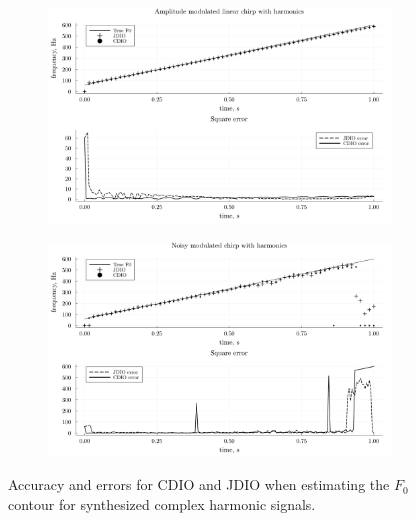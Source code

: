 \documentclass[a4paper]{article}
\begin{document}
\begin{figure}
    \begin{subfigure}[b]{\textwidth}
        \centering
        \includegraphics{graphics/amp_mod_harmonic_chirp.png}
        \caption{}
    \end{subfigure}
    \begin{subfigure}[b]{\textwidth}
        \centering
        \includegraphics{graphics/noisy_harmonic_chirp.png}
        \caption{}
    \end{subfigure}
    \caption{Accuracy and errors for CDIO and JDIO when estimating the $F_0$ contour for synthesized complex harmonic signals.}
    \label{fig:f0_estimations}
\end{figure}
\end{document}
